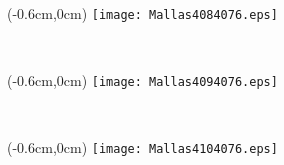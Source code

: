 \documentclass[12pt,letterpaper,oneside]{report}
\begin{document}
\ \pagebreak
\begin{textblock*}{\paperwidth}(-0.6cm,0cm)
\texttt{[image: Mallas4084076.eps]}
\end{textblock*}

\ \pagebreak
\begin{textblock*}{\paperwidth}(-0.6cm,0cm)
\texttt{[image: Mallas4094076.eps]}
\end{textblock*}

\ \pagebreak
\begin{textblock*}{\paperwidth}(-0.6cm,0cm)
\texttt{[image: Mallas4104076.eps]}
\end{textblock*}

\ \pagebreak
\end{document}

